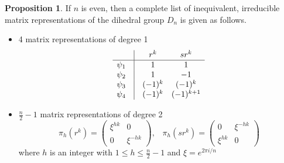 \documentclass{book}
\theoremstyle{definition}
\newtheorem{proposition}[lemma]{Proposition}
\theoremstyle{remarkstyle}
\begin{document}
\begin{proposition}
    If $n$ is even, then a complete list of inequivalent, irreducible matrix representations of the dihedral group $D_n$ is given as follows.
    \begin{itemize}
        \item 4 matrix representations of degree 1
        $$
        \begin{array}{cccc}
           & \vline & r^k & sr^k  \\
        \hline
        \psi_1 & \vline & 1 & 1 \\
        \psi_2 & \vline & 1 & -1 \\
        \psi_3 & \vline & (-1)^k & (-1)^k \\
        \psi_4 & \vline & (-1)^k & (-1)^{k+1} \\
        \end{array}
        $$
        \item $\frac{n}{2}-1$ matrix representations of degree 2
        $$
        \pi_h(r^k) = \left(\begin{array}{cc}
           \xi^{hk} & 0  \\
            0 & \xi^{-hk}  
        \end{array}\right), \;\;\;
        \pi_h(sr^k) = \left(\begin{array}{cc}
            0 & \xi^{-hk}  \\
            \xi^{hk} & 0  
        \end{array}\right)
        $$
        where $h$ is an integer with $1\le h\le \frac{n}{2}-1$ and $\xi = e^{2\pi i/n} $
    \end{itemize}
\end{proposition}
\end{document}

